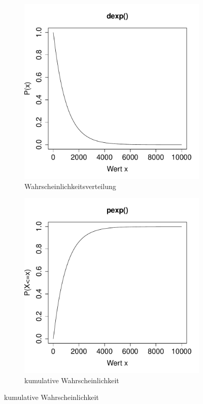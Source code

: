 \begin{figure}[h!]
\centering
\begin{subfigure}[b]{0.48\textwidth}
\includegraphics{verteilungen-081}
\caption{Wahrscheinlichkeitsverteilung}
\end{subfigure}
\begin{subfigure}[b]{0.48\textwidth}
\includegraphics{verteilungen-082}
\caption{kumulative Wahrscheinlichkeit}
\end{subfigure}


\end{figure}
